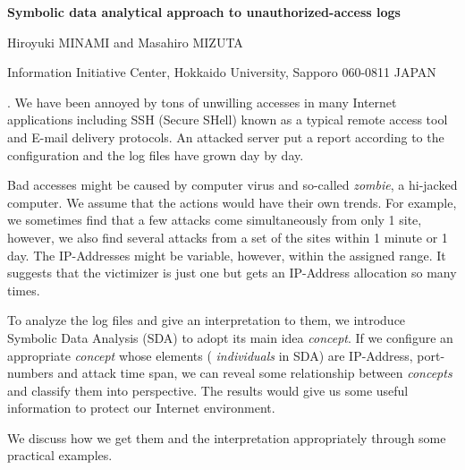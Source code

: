 \documentclass[12pt]{article}
\begin{document}
\begin{flushleft}


{\LARGE\bf Symbolic data analytical approach to unauthorized-access logs}

\vspace{1.0cm}

Hiroyuki MINAMI and Masahiro MIZUTA

\begin{description}

\item Information Initiative Center, Hokkaido University, Sapporo 060-0811
  JAPAN
\end{description}

\end{flushleft}


\vspace{0.75cm}

. We have been annoyed by tons of unwilling
accesses in many Internet applications including SSH (Secure SHell) known
as a typical remote access tool and E-mail delivery protocols.
An attacked server put a report according to the configuration and the log
files have grown day by day.

Bad accesses might be caused by computer virus and so-called {\em zombie},
a hi-jacked computer. We assume that the actions would have their
own trends. For example, we sometimes find that a few attacks come
simultaneously from only 1 site, however, we also find several attacks
from a set of the sites within 1 minute or 1 day. The IP-Addresses might
be variable, however, within the assigned range. It suggests that the
victimizer is just one but gets an IP-Address allocation so many times.

To analyze the log files and give an interpretation to them, we introduce
Symbolic Data Analysis (SDA) to adopt its main idea {\em concept}.
If we configure an appropriate {\em concept} whose elements ({\em
  individuals} in SDA) are IP-Address, port-numbers and attack time span,
we can reveal some relationship between {\em concepts} and classify them
into perspective. The results would give us some useful information to
protect our Internet environment.

We discuss how we get them and the interpretation appropriately through
some practical examples.

\vskip 2mm
\end{document}
